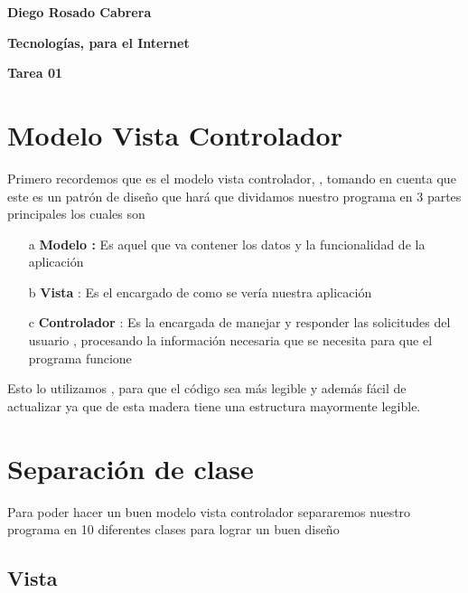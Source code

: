 \documentclass[10pt,a4paper]{article}
\begin{document}
\begin{large}
\begin{center}
\textbf{Diego Rosado Cabrera}\vspace{.3cm}

\textbf{Tecnologías, para el Internet}\vspace{.3cm}

\textbf{Tarea 01}
\end{center}
\end{large}

\begin{flushleft}
\section{Modelo Vista Controlador}

Primero recordemos que es el modelo vista controlador, , tomando en cuenta que este es un patrón de diseño que hará que dividamos nuestro programa en 3 partes principales los cuales son 

\begin{itemize}
\item[a] \textbf{Modelo :} Es aquel que va contener los datos y la funcionalidad de la aplicación

\item[b] \textbf{Vista } : Es el encargado de como se vería nuestra aplicación 

\item[c] \textbf{Controlador } : Es la encargada de manejar y responder las solicitudes del usuario , procesando la información necesaria que se necesita para que el programa funcione

    
\end{itemize}
Esto lo utilizamos , para que el código sea más legible  y además fácil de actualizar ya que de esta madera tiene una estructura mayormente legible.  

\section{Separación de clase }

\begin{flushleft}
Para poder hacer un buen modelo vista controlador separaremos nuestro programa en 10 diferentes clases para lograr un buen diseño 

\subsection{Vista}
 

\end{flushleft}
\end{flushleft}
\end{document}

